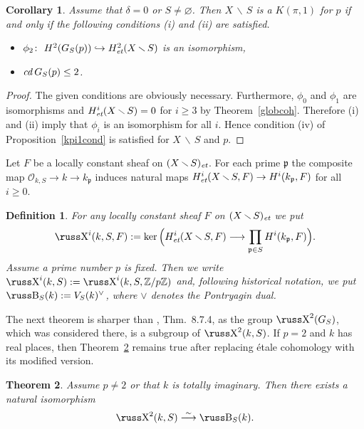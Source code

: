 \documentclass[10pt]{article}
\def\mapr#1{\stackrel{#1}{\longrightarrow}}
\newcommand{\Z}{{\mathbb Z}}
\renewcommand{\O}{{\mathcal{O}}}
\newcommand{\p}{{\mathfrak p}}
\newcommand{\sm}{{\,\smallsetminus\,}}
\newcommand{\et}{\text{\it et}}
\newcommand{\cd}{\text{\it cd}\:}
\def\Sha{\hbox{\russ\char88}}
\def\Be{\hbox{\russ\char66}}
\theoremstyle{alex}
\newtheorem{theorem}{Theorem}[section]
\newtheorem{corollary}[theorem]{Corollary}
\theoremstyle{alexdef}
\newtheorem*{definition}{Definition}
\begin{document}
\begin{corollary} \label{condforkpi1}
Assume that $\delta=0$ or $S\neq\varnothing$. Then  $X\sm S$ is a $K(\pi,1)$ for $p$ if and only if the following conditions {\rm (i)} and {\rm (ii)} are satisfied.
\begin{itemize}
\item[\rm (i)] $\phi_{2}\colon\ H^2(G_S(p))\hookrightarrow H^2_\et(X\sm S)$ is an isomorphism,
\item[\rm (ii)] $\cd G_S(p) \leq 2$.
\end{itemize}
\end{corollary}

\begin{proof} The given conditions are obviously necessary.
Furthermore,  $\phi_{0}$  and $\phi_{1}$ are isomorphisms and $H^i_\et(X\sm S)=0$ for $i\geq 3$ by Theorem~\ref{globcoh}. Therefore (i) and (ii) imply that $\phi_{i}$ is an isomorphism for all $i$. Hence condition (iv) of Proposition~\ref{kpi1cond} is satisfied for $X\sm S$ and $p$.
\end{proof}

\bigskip
Let $F$ be a  locally constant sheaf on $(X\sm S)_\et$.
For each prime $\p$ the composite map $\O_{k,S} \to k \to k_\p$ induces natural maps $H^i_\et (X\sm S, F)\to H^i(k_\p, F)$ for all $i\geq 0$.

\begin{definition} For any locally constant sheaf $F$ on $(X\sm S)_\et$ we put
\[
\Sha^i(k,S,F):= \ker \Big( H^i_\et (X\sm S, F)\longrightarrow \prod_{\p\in S} H^i(k_\p, F) \Big).
\]
Assume a prime number $p$ is fixed. Then we write $\Sha^i(k,S):=\Sha^i(k,S,\Z/p\Z)$ and,  following historical notation, we put $\Be_S(k):= V_S(k)^\vee$, where
 $\scriptstyle \vee$ denotes the Pontryagin dual.
\end{definition}

The next theorem is sharper than \cite{NSW}, Thm.~8.7.4, as the group $\Sha^2(G_S)$, which was considered there, is a subgroup of $\Sha^2(k,S)$.   If $p=2$ and $k$ has real places, then Theorem~\ref{shaincl} remains true after replacing \'{e}tale cohomology with its modified version.

\begin{theorem} \label{shaincl} Assume $p\neq 2$ or that $k$ is totally imaginary. Then
there exists a natural isomorphism
\[
\Sha^2(k,S) \mapr{\sim} \Be_S(k).
\]
\end{theorem}
\end{document}
